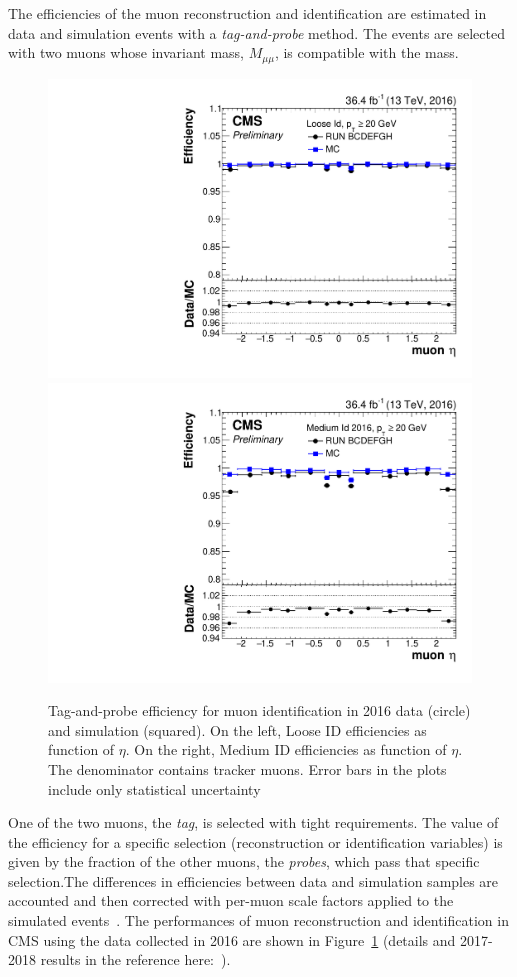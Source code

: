 The efficiencies of the muon reconstruction and identification are
estimated in data and simulation events with a \emph{tag-and-probe}
method. The events are selected with two muons whose invariant mass,
$M_{\mu \mu}$, is compatible with the \PZ mass. 
\begin{figure}[h!]
\centering
\includegraphics[width=.48\textwidth]{Figures/c2/TnP_MC_NUM_LooseID_DEN_genTracks_PAR_eta_.pdf}
\includegraphics[width=.48\textwidth]{Figures/c2/TnP_MC_NUM_MediumID2016_DEN_genTracks_PAR_eta_.pdf}
\caption{Tag-and-probe efficiency for muon identification in 2016 data
  (circle) and simulation (squared). On the left, Loose ID efficiencies as function of $\eta$. 
On the right, Medium ID efficiencies as function of $\eta$. The
  denominator contains tracker muons. Error bars in the plots include only statistical uncertainty~\cite{CMS-DP-2017-007}}
\label{fig:2016eff}
\end{figure}
One of the two muons,
the \emph{tag}, is selected with tight requirements. The value of the
efficiency for a specific selection (reconstruction or identification
variables) is given by the fraction of the other muons, the
\emph{probes}, which pass that specific selection.The differences in
efficiencies between data and simulation samples are accounted and
then corrected with per-muon scale factors applied to the simulated
events~\cite{Sirunyan_2018_muon}. The performances of muon
reconstruction and identification in CMS using the data collected in
2016 are shown in Figure~\ref{fig:2016eff} (details and 2017-2018
results in the reference
here:~\cite{CMS-DP-2017-007,CMS-DP-2018-042}).

